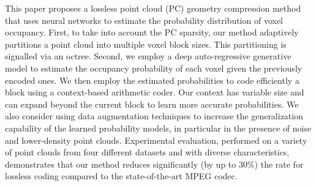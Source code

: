 This paper proposes a lossless point cloud (PC) geometry compression method that uses neural networks to estimate the probability distribution of voxel occupancy. First, to take into account the PC sparsity, our method adaptively partitions a point cloud into multiple voxel block sizes. This partitioning is signalled via an octree. Second, we employ a deep auto-regressive generative model to estimate the occupancy probability of each voxel given the previously encoded ones. We then employ the estimated probabilities to code efficiently a block using a context-based arithmetic coder. Our context has variable size and can expand beyond the current block to learn more accurate probabilities. We also consider using data augmentation techniques to increase the generalization capability of the learned probability models, in particular in the presence of noise and lower-density point clouds. Experimental evaluation, performed on a variety of point clouds from four different datasets and with diverse characteristics, demonstrates that our method reduces significantly (by up to 30\%) the rate for lossless coding compared to the state-of-the-art MPEG codec.
